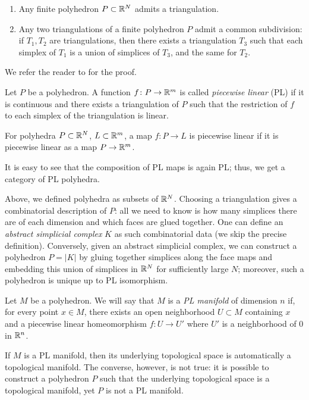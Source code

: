 \begin{theorem}\label{t:triangulation1}
  \par\noindent
  \begin{enumerate}
  \item
    Any finite polyhedron $P\subset \mathbb{R}^N$ admits a triangulation.
  \item
    Any two triangulations of a finite polyhedron $P$ admit a common
    subdivision: if $T_1,T_2$ are triangulations, then there exists a
    triangulation $T_3$ such that each simplex of $T_1$ is a union of simplices
    of $T_3$, and the same for $T_2$.
   \end{enumerate}
\end{theorem}
We refer the reader to \cite[Theorem 2.11, Addendum 2.12]{rourke} for
the proof.
\begin{definition}
  Let $P$ be a polyhedron. A function $f\colon P\to \mathbb{R}^m$ is called \emph{%
  piecewise linear} (PL) if it is continuous and there exists a triangulation of
  $P$ such that the restriction of $f$ to each simplex of the triangulation
  is linear.

  For polyhedra $P\subset \mathbb{R}^N$, $L\subset \mathbb{R}^m$, a map $f\colon P\to L$
  is piecewise linear if it is piecewise linear as a map $P\to \mathbb{R}^m$.
\end{definition}
It is easy to see that the composition of PL maps is again PL; thus, we get a
category of PL polyhedra.

\begin{remark}
  Above, we defined polyhedra as subsets of $\mathbb{R}^N$. Choosing a triangulation
  gives a combinatorial description of $P$: all we need to know is how many
  simplices there are of each dimension and which faces are glued together. One
  can define an \emph{abstract simplicial complex} $K$ as such combinatorial
  data (we skip the precise definition). Conversely, given an abstract
  simplicial complex, we can construct a polyhedron $P=|K|$ by gluing together
  simplices along the face maps and embedding this union of simplices in $\mathbb{R}^N$
  for sufficiently large $N$; moreover, such a polyhedron is unique up to PL
  isomorphism.
\end{remark}

\begin{definition}\label{d:PLmanifold}
  Let $M$ be a polyhedron. We will say that $M$ is a \emph{PL manifold} of dimension $n$ if, for every point $x \in M$, there exists an open
  neighborhood $U \subset M$ containing $x$ and a piecewise linear homeomorphism
  $f\colon U \to U'$ where $U'$ is a neighborhood of 0 in $\mathbb{R}^n$.
\end{definition}
\begin{remark}
  If $M$ is a PL manifold, then its underlying topological space is
  automatically a topological manifold. The converse, however, is not true: it
  is possible to construct a polyhedron $P$ such that the underlying topological
  space is a topological manifold, yet $P$ is not a PL manifold.
\end{remark}

